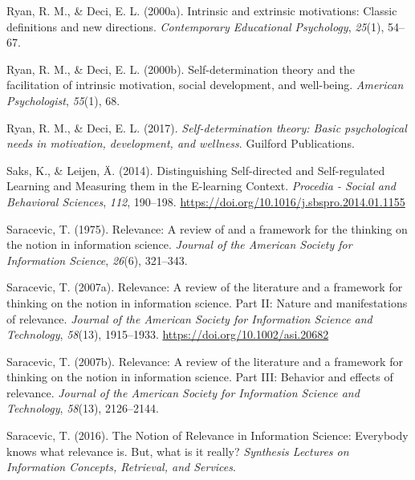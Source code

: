 \documentclass[letterpaper, nobind]{templates/ociamthesis}
\newlength{\cslhangindent}
\newenvironment{CSLReferences}[2] %
 {%
  \setlength{\parindent}{0pt}
  \ifodd #1
  \let\oldpar\par
  \def\par{\hangindent=\cslhangindent\oldpar}
  \fi
  \setlength{\parskip}{1mm}
  \setlength{\baselineskip}{6mm}
 }%
 {}
\begin{document}
\begin{CSLReferences}{1}{0}
\leavevmode{}%
Ryan, R. M., \& Deci, E. L. (2000a). Intrinsic and extrinsic motivations: Classic definitions and new directions. \emph{Contemporary Educational Psychology}, \emph{25}(1), 54--67.

\leavevmode{}%
Ryan, R. M., \& Deci, E. L. (2000b). Self-determination theory and the facilitation of intrinsic motivation, social development, and well-being. \emph{American Psychologist}, \emph{55}(1), 68.

\leavevmode{}%
Ryan, R. M., \& Deci, E. L. (2017). \emph{Self-determination theory: Basic psychological needs in motivation, development, and wellness}. Guilford Publications.

\leavevmode{}%
Saks, K., \& Leijen, Ä. (2014). Distinguishing {Self}-directed and {Self}-regulated {Learning} and {Measuring} them in the {E}-learning {Context}. \emph{Procedia - Social and Behavioral Sciences}, \emph{112}, 190--198. \url{https://doi.org/10.1016/j.sbspro.2014.01.1155}

\leavevmode{}%
Saracevic, T. (1975). Relevance: A review of and a framework for the thinking on the notion in information science. \emph{Journal of the American Society for Information Science}, \emph{26}(6), 321--343.

\leavevmode{}%
Saracevic, T. (2007a). Relevance: A review of the literature and a framework for thinking on the notion in information science. {Part II}: Nature and manifestations of relevance. \emph{Journal of the American Society for Information Science and Technology}, \emph{58}(13), 1915--1933. \url{https://doi.org/10.1002/asi.20682}

\leavevmode{}%
Saracevic, T. (2007b). Relevance: A review of the literature and a framework for thinking on the notion in information science. {Part III}: Behavior and effects of relevance. \emph{Journal of the American Society for Information Science and Technology}, \emph{58}(13), 2126--2144.

\leavevmode{}%
Saracevic, T. (2016). The {Notion} of {Relevance} in {Information Science}: {Everybody} knows what relevance is. {But}, what is it really? \emph{Synthesis Lectures on Information Concepts, Retrieval, and Services}.


\end{CSLReferences}
\end{document}
